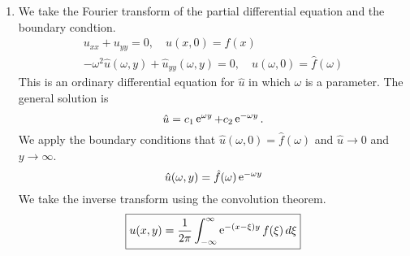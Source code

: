 {\begin{Solution}
\begin{enumerate}
    Our equation for $\hat{u}(\omega)$ becomes,
    \begin{gather*}
      2 \pi \hat{u}(\omega) \frac{1}{2 a} \e^{-a |\omega| }
      = \frac{1}{2 b} \e^{-b |\omega|} \\
      \hat{u}(\omega) = \frac{ a }{ 2 \pi b } \e^{- (b-a) |omega| }.
    \end{gather*}
    We take the inverse Fourier transform using the transform pair we derived
    above.
    \begin{gather*}
      u(x) = \frac{ a }{ 2 \pi b } \frac{ 2 (b-a) }{ x^2 + (b-a)^2 } \\
      \boxed{
        u(x) = \frac{ a (b-a) }{ \pi b ( x^2 + (b-a)^2 ) } 
        }
    \end{gather*}
  \item
    We take the Fourier transform of the partial differential equation and the
    boundary condtion.
    \begin{align*}
      u_{x x} + u_{y y} = 0, \quad u(x,0) = f(x) \\
      - \omega^2 \hat{u}(\omega,y) + \hat{u}_{y y}(\omega,y) = 0, 
      \quad \hat{u}(\omega,0) = \hat{f}(\omega) 
    \end{align*}
    This is an ordinary differential equation for $\hat{u}$ in which $\omega$ 
    is a parameter.  The general solution is
    \[
    \hat{u} = c_1 \mathop{\mathrm{e}}\nolimits^{\omega y} + c_2 \mathop{\mathrm{e}}\nolimits^{- \omega y}.
    \]
    We apply the boundary conditions that $\hat{u}(\omega,0) = \hat{f}(\omega)$
    and $\hat{u} \to 0$ and $y \to \infty$.
    \[
    \hat{u}(\omega,y) = \hat{f}(\omega) \mathop{\mathrm{e}}\nolimits^{- \omega y}
    \]
    We take the inverse transform using the convolution theorem.
    \[
    \boxed{
      u(x,y) = \frac{1}{2\pi} \int_{-\infty}^\infty \mathop{\mathrm{e}}\nolimits^{- (x - \xi) y } f(\xi) \,d \xi
      }
    \]
  \end{enumerate}
\end{Solution}








}
